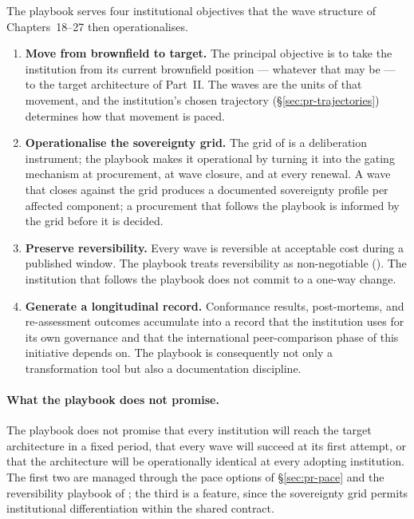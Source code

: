 The playbook serves four institutional objectives that the wave
structure of Chapters~18--27 then operationalises.

\begin{enumerate}[leftmargin=2em,nosep]
  \item \textbf{Move from brownfield to target.} The principal
    objective is to take the institution from its current
    brownfield position --- whatever that may be --- to the
    target architecture of Part~II. The waves are the units of
    that movement, and the institution's chosen trajectory
    (\S\ref{sec:pr-trajectories}) determines how that movement
    is paced.
  \item \textbf{Operationalise the sovereignty grid.} The grid of
     is a deliberation instrument;
    the playbook makes it operational by turning it into the
    gating mechanism at procurement, at wave closure, and at
    every renewal. A wave that closes against the grid produces
    a documented sovereignty profile per affected component; a
    procurement that follows the playbook is informed by the
    grid before it is decided.
  \item \textbf{Preserve reversibility.} Every wave is reversible
    at acceptable cost during a published window. The playbook
    treats reversibility as non-negotiable
    (). The institution that follows
    the playbook does not commit to a one-way change.
  \item \textbf{Generate a longitudinal record.} Conformance
    results, post-mortems, and re-assessment outcomes accumulate
    into a record that the institution uses for its own
    governance and that the international peer-comparison phase
    of this initiative depends on. The playbook is consequently
    not only a transformation tool but also a documentation
    discipline.
\end{enumerate}

\paragraph{What the playbook does not promise.} The playbook does
not promise that every institution will reach the target
architecture in a fixed period, that every wave will succeed at
its first attempt, or that the architecture will be operationally
identical at every adopting institution. The first two are
managed through the pace options of \S\ref{sec:pr-pace} and the
reversibility playbook of ; the third
is a feature, since the sovereignty grid permits institutional
differentiation within the shared contract.

